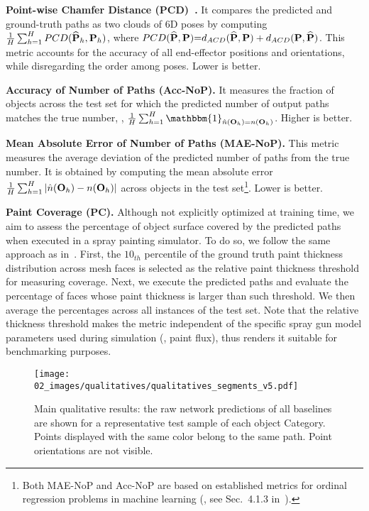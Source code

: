 \noindent \textbf{Point-wise Chamfer Distance (PCD)~\cite{Fan_Point_2017}.} It compares the predicted and ground-truth paths as two clouds of 6D poses by computing $\frac{1}{H}\sum_{h=1}^H PCD(\mathbf{\widehat{P}}_h, \mathbf{P}_h)$, where $PCD(\mathbf{\widehat{P}}, \mathbf{P}) {=} d_{ACD}(\mathbf{\widehat{P}} ,\mathbf{P}) + d_{ACD}( \mathbf{P},\mathbf{\widehat{P}})$. This metric accounts for the accuracy of all end-effector positions and orientations, while disregarding the order among poses. Lower is better.

\noindent \textbf{Accuracy of Number of Paths (Acc-NoP).} It measures the fraction
of objects across the test set for which the predicted number of output paths matches the true number, \ie, $\frac{1}{H}\sum_{h=1}^H\mathbbm{1}_{\hat{n}(\bO_h)=n(\bO_h)}$. Higher is better.

\noindent \textbf{Mean Absolute Error of Number of Paths (MAE-NoP).} This metric measures the average deviation of the predicted number of paths from the true number. It is obtained by 
computing the mean absolute error $\frac{1}{H}\sum_{h=1}^H\vert \hat{n}(\mathbf{O}_h) - n(\mathbf{O}_h)\vert$ 
across objects in the test set\footnote{Both MAE-NoP and Acc-NoP are based on established metrics for ordinal regression problems in machine learning (\eg, see Sec.~4.1.3 in~\cite{7161338}).}. 
Lower is better.

\noindent \textbf{Paint Coverage (PC).}
Although not explicitly optimized at training time, we aim to assess the percentage of object surface covered by the predicted paths when executed in a spray painting simulator.
%
To do so, we follow the same approach as in~\cite{tiboni2023paintnet}.
First, the $10_{th}$ percentile of the ground truth paint thickness distribution across mesh faces is selected as the relative paint thickness threshold for measuring coverage. 
%
Next, we execute the predicted paths and evaluate the percentage of faces whose paint thickness is larger than such threshold.
We then average the percentages across all instances of the test set. 
Note that the relative thickness threshold makes the metric independent of the specific spray gun model parameters used during simulation (\eg, paint flux), thus renders it suitable for benchmarking purposes.


\begin{figure*}[!t]
    \centering
    \texttt{[image: 02\_images/qualitatives/qualitatives\_segments\_v5.pdf]}
    \caption{
        Main qualitative results: the raw network predictions of all baselines are shown for a representative test sample of each object Category. Points displayed with the same color belong to the same path. Point orientations are not visible.
    }
    \label{fig:qualitatives_segments_prediction}
\end{figure*}

